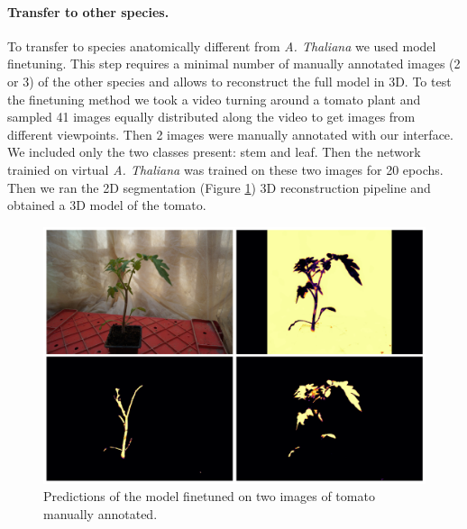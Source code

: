\paragraph{Transfer to other species.}
To transfer to species anatomically different from \emph{A. Thaliana} we used model finetuning. This step requires a minimal number of manually annotated images (2 or 3) of the other species and allows to reconstruct the full model in 3D. To test the finetuning method we took a video turning around a tomato plant and sampled 41 images equally distributed along the video to get images from different viewpoints. Then 2 images were manually annotated with our interface. We included only the two classes present: stem and leaf. Then the network trainied on virtual \emph{A. Thaliana} was trained on these two images for 20 epochs. Then we ran the 2D segmentation (Figure \ref{fig:finetune2D}) 3D reconstruction pipeline and obtained a 3D model of the tomato.

\begin{figure}
    \centering \includegraphics[width = \linewidth]{figures/finetune.png}
    \caption{Predictions of the model finetuned on two images of tomato manually annotated.} \label{fig:finetune2D}
\end{figure}



